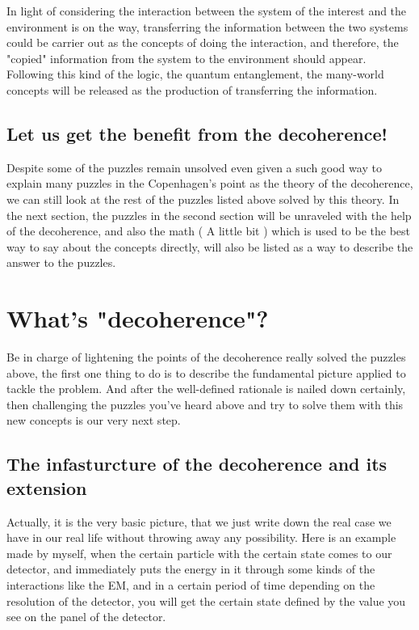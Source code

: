 \documentclass[final,1p,12pt]{elsarticle}
\begin{document}
In light of considering the interaction between the system of the interest and the environment is on the way, transferring the information between the two systems could be carrier out as the concepts of doing the interaction, and therefore, the "copied" information from the system to the environment should appear. Following this kind of the logic, the quantum entanglement, the many-world concepts will be released as the production of transferring the information.\\

\subsection{Let us get the benefit from the decoherence!}
Despite some of the puzzles remain unsolved even given a such good way to explain many puzzles in the Copenhagen's point as the theory of the decoherence, we can still look at the rest of the puzzles listed above solved by this theory. In the next section, the puzzles in the second section will be unraveled with the help of the decoherence, and also the math ( A little bit ) which is used to be the best way to say about the concepts directly, will also be listed as a way to describe the answer to the puzzles.\\

\section{What's "decoherence"?}
Be in charge of lightening the points of the decoherence really solved the puzzles above, the first one thing to do is to describe the fundamental picture applied to tackle the problem. And after the well-defined rationale is nailed down certainly, then challenging the puzzles you've heard above and try to solve them with this new concepts is our very next step. \\
\subsection{The infasturcture of the decoherence and its extension}
Actually, it is the very basic picture, that we just write down the real case we have in our real life without throwing away any possibility. Here is an example made by myself, when the certain particle with the certain state comes to our detector, and immediately puts the energy in it through some kinds of the interactions like the EM, and in a certain period of time depending on the resolution of the detector, you will get the certain state defined by the value you see on the panel of the detector. \\
\end{document}

